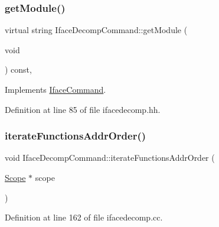 \mbox{\label{class_iface_decomp_command_aa1505dc6014dbdca5f922a826cd04b40}} 
\subsubsection{\texorpdfstring{getModule()}{getModule()}}
{\footnotesize\ttfamily virtual string Iface\+Decomp\+Command\+::get\+Module (\begin{DoxyParamCaption}\item[{void}]{ }\end{DoxyParamCaption}) const\hspace{0.3cm}{\ttfamily [inline]}, {\ttfamily [virtual]}}



Implements \mbox{\hyperlink{class_iface_command_a06f9500f4b0a0e3cf14010cf133502d5}{Iface\+Command}}.



Definition at line 85 of file ifacedecomp.\+hh.

\mbox{\label{class_iface_decomp_command_a002b0fafba1c9f44ae4255a45f604148}} 
\subsubsection{\texorpdfstring{iterateFunctionsAddrOrder()}{iterateFunctionsAddrOrder()}\hspace{0.1cm}{\footnotesize\ttfamily [1/2]}}
{\footnotesize\ttfamily void Iface\+Decomp\+Command\+::iterate\+Functions\+Addr\+Order (\begin{DoxyParamCaption}\item[{\mbox{\hyperlink{class_scope}{Scope}} $\ast$}]{scope }\end{DoxyParamCaption})\hspace{0.3cm}{\ttfamily [protected]}}



Definition at line 162 of file ifacedecomp.\+cc.


